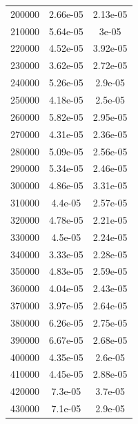 \documentclass{article}
\begin{document}
\begin{longtable}{c|c|c}
           200000 &               2.66e-05 &               2.13e-05 \\
           210000 &               5.64e-05 &               3e-05    \\
           220000 &               4.52e-05 &               3.92e-05 \\
           230000 &               3.62e-05 &               2.72e-05 \\
           240000 &               5.26e-05 &               2.9e-05  \\
           250000 &               4.18e-05 &               2.5e-05  \\
           260000 &               5.82e-05 &               2.95e-05 \\
           270000 &               4.31e-05 &               2.36e-05 \\
           280000 &               5.09e-05 &               2.56e-05 \\
           290000 &               5.34e-05 &               2.46e-05 \\
           300000 &               4.86e-05 &               3.31e-05 \\
           310000 &               4.4e-05  &               2.57e-05 \\
           320000 &               4.78e-05 &               2.21e-05 \\
           330000 &               4.5e-05  &               2.24e-05 \\
           340000 &               3.33e-05 &               2.28e-05 \\
           350000 &               4.83e-05 &               2.59e-05 \\
           360000 &               4.04e-05 &               2.43e-05 \\
           370000 &               3.97e-05 &               2.64e-05 \\
           380000 &               6.26e-05 &               2.75e-05 \\
           390000 &               6.67e-05 &               2.68e-05 \\
           400000 &               4.35e-05 &               2.6e-05  \\
           410000 &               4.45e-05 &               2.88e-05 \\
           420000 &               7.3e-05  &               3.7e-05  \\
           430000 &               7.1e-05  &               2.9e-05  \\

\end{longtable}
\end{document}
